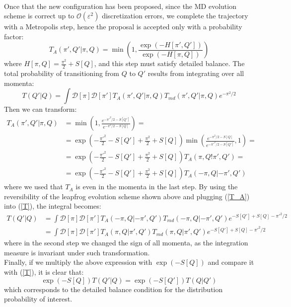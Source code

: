 \\ Once that the new configuration has been proposed, since the MD evolution scheme is correct up to $\mathcal{O}(\varepsilon^2)$ discretization errors, we complete the trajectory with a Metropolis step, hence the proposal is accepted only with a probability factor:
\begin{equation}
    T_A(\pi', Q'| \pi, Q) = \min\left(1, \frac{\exp(-H[\pi', Q'])}{\exp(-H[\pi, Q])}\right)
\end{equation}
where $H[\pi, Q] = \frac{\pi^2}{2} + S[Q]$, and this step must satisfy detailed balance. The total probability of transitioning from $Q$ to $Q'$ results from integrating over all momenta:
\begin{equation}\label{T}
    T(Q'|Q) = \int \mathcal{D}[\pi] \mathcal{D}[\pi'] T_A(\pi', Q'|\pi, Q) T_{md} (\pi', Q'| \pi, Q) e^{-\pi^2/2}
\end{equation}
Then we can transform:
\begin{equation}\label{T_A}
    \begin{split}
        T_A(\pi', Q'| \pi, Q) & = \min\left(1, \frac{e^{-\pi'^2/2 - S[Q']}}{e^{-\pi^2/2 - S[Q]}} \right) = \\
        & = \exp(-\frac{\pi'^2}{2} - S[Q'] + \frac{\pi^2}{2} + S[Q]) \min\left(\frac{e^{-\pi^2/2 - S[Q]}}{e^{-\pi'^2/2 - S[Q']}}, 1 \right) = \\ 
        & = \exp(-\frac{\pi'^2}{2} - S[Q'] + \frac{\pi^2}{2} + S[Q]) T_A(\pi, Q!\pi', Q') = \\
        & = \exp(-\frac{\pi'^2}{2} - S[Q'] + \frac{\pi^2}{2} + S[Q]) T_A(-\pi, Q|-\pi', Q')
    \end{split}
\end{equation}
where we used that $T_A$ is even in the momenta in the last step. By using the reversibility of the leapfrog evolution scheme shown above and plugging (\ref{T_A}) into (\ref{T}), the integral becomes:
\begin{equation}
    \begin{split}
        T(Q'|Q) &= \int \mathcal{D}[\pi] \mathcal{D}[\pi'] T_A(-\pi, Q|-\pi', Q') T_{md} (-\pi, Q| -\pi', Q') e^{-S[Q'] + S[Q] -\pi'^2/2} \\ 
        &= \int \mathcal{D}[\pi] \mathcal{D}[\pi'] T_A(\pi, Q|\pi', Q') T_{md} (\pi, Q| \pi', Q') e^{-S[Q'] + S[Q] -\pi'^2/2}
    \end{split}
\end{equation}
where in the second step we changed the sign of all momenta, as the integration measure is invariant under such transformation.
\\ Finally, if we multiply the above expression with $\exp(-S[Q])$ and compare it with (\ref{T}), it is clear that:
\begin{equation}
    \exp(-S[Q]) T(Q'|Q) = \exp(-S[Q']) T(Q|Q')
\end{equation}
which corresponds to the detailed balance condition for the distribution probability of interest. 